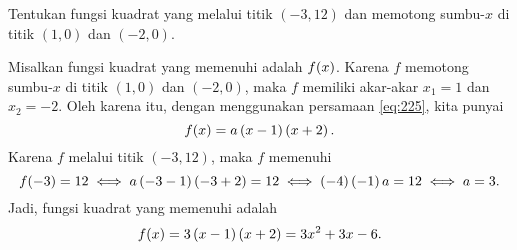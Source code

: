 	\begin{contoh}
		Tentukan fungsi kuadrat yang melalui titik $ \left(-3, 12\right) $ dan memotong sumbu-$ x $ di titik $ \left(1, 0\right) $ dan $ \left(-2, 0\right) $.
	\end{contoh}
	\begin{jawab}
		Misalkan fungsi kuadrat yang memenuhi adalah $ \mathop{}\!{f}{\left({x}\right)} $. Karena $ f $ memotong sumbu-$ x $ di titik $ \left(1, 0\right) $ dan $ \left(-2, 0\right) $, maka $ f $ memiliki akar-akar $ x_{1} = 1 $ dan $ x_{2} = -2 $. Oleh karena itu, dengan menggunakan persamaan \ref{eq:225}, kita punyai
		\[ \mathop{}\!{f}{\left({x}\right)} = a\left(x - 1\right)\left(x + 2\right). \]
		Karena $ f $ melalui titik $ \left(-3, 12\right) $, maka $ f $ memenuhi
		\[ \mathop{}\!{f}{\left({-3}\right)} = 12 \iff a\left(-3 - 1\right)\left(-3 + 2\right) = 12 \iff \left(-4\right)\left(-1\right)a = 12 \iff a = 3. \]
		Jadi, fungsi kuadrat yang memenuhi adalah
		\[ \mathop{}\!{f}{\left({x}\right)} = 3\left(x - 1\right)\left(x + 2\right) = 3x^{2} + 3x - 6. \]
	\end{jawab}
	
